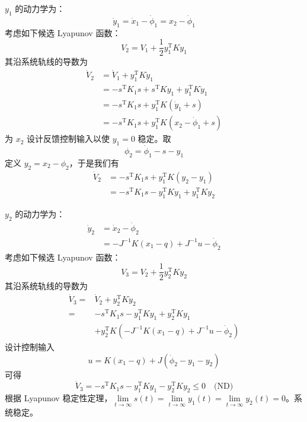 $y_1$ 的动力学为：
\[
    \dot{y}_ 1 = \dot{x}_1 - \dot{\phi}_1 = x_2 - \dot{\phi}_1
\]
考虑如下候选 Lyapunov 函数：
\[
    V_2 = V_1 + \dfrac{1}{2} y_1^\mathrm{T} K y_1
\]
其沿系统轨线的导数为
\begin{align*}
     \dot{V}_2 &= \dot{V}_1 + y^\mathrm{T}_1  K  \dot{y}_1 \\
     &= - s^\mathrm{T} K_1 s + s^\mathrm{T} K  y_1 + y^\mathrm{T}_1 K  \dot{y}_1 \\
     &= - s^\mathrm{T} K_1 s + y^\mathrm{T}_1 K ( \dot{y}_1 + s) \\
     &= - s^\mathrm{T} K_1 s + y^\mathrm{T}_1 K ( x_2 - \dot{\phi}_1 + s)
\end{align*}
为  $x_2$ 设计反馈控制输入以使 $y_1=0$ 稳定。取
\[
    \phi_2 = \dot{\phi}_1 - s - y_1
\]
定义 $y_2 = x_2 - \phi_2$，于是我们有
\begin{align*}
    \dot{V}_2 &= - s^\mathrm{T} K_1 s + y_1^\mathrm{T} K (y_2 - y_1) \\
    &= - s^\mathrm{T} K_1 s - y_1^\mathrm{T} K y_1 + y_1^\mathrm{T} K y_2
\end{align*}


$y_2$ 的动力学为：
\begin{align*}
     \dot{y}_2 &= \dot{x}_2 - \dot{\phi}_2 \\
     &= - J^{- 1} K (x_1 - q) + J^{- 1} u - \dot{\phi}_2
\end{align*}
考虑如下候选 Lyapunov 函数：
\[
    V_3 = V_2 + \dfrac{1}{2} y_2^\mathrm{T} K y_2
\]
其沿系统轨线的导数为
\begin{align*}
    \dot{V}_3 =& \dot{V}_2 + y_2^\mathrm{T} K \dot{y}_2 \\
    =&  - s^\mathrm{T} K_1 s - y_1^\mathrm{T} K y_1 + y_2^\mathrm{T} K y_1 \\
    &+ y_2^\mathrm{T} K (- J^{- 1} K (x_1 - q) + J^{- 1} u - \dot{\phi}_2)
\end{align*}
设计控制输入
\[
    u = K (x_1 - q) + J (\dot{\phi}_2 - y_1 - y_2)
\]
可得
\[
    \dot{V}_3 = - s^\mathrm{T} K_1 s - y_1^\mathrm{T} K y_1- y^\mathrm{T}_2 K  y_2 \leq 0 \quad \text{(ND)}
\]
根据 Lyapunov 稳定性定理，$\lim\limits_{t \rightarrow \infty} s (t) = \lim\limits_{t
\rightarrow \infty} y_1 (t) = \lim\limits_{t \rightarrow \infty} y_2 (t) = 0$。系统稳定。

